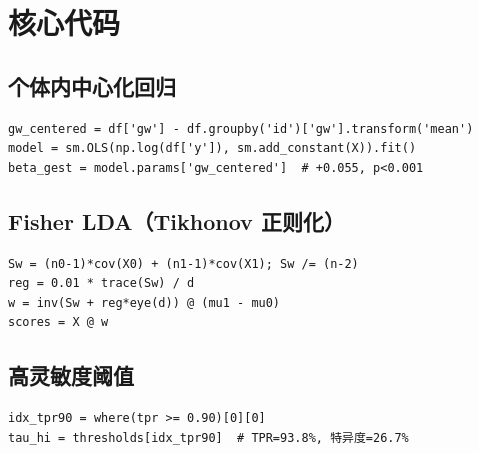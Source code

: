 \documentclass{mcm-paper}
\begin{document}
\section{核心代码}

\subsection{个体内中心化回归}
\begin{verbatim}
gw_centered = df['gw'] - df.groupby('id')['gw'].transform('mean')
model = sm.OLS(np.log(df['y']), sm.add_constant(X)).fit()
beta_gest = model.params['gw_centered']  # +0.055, p<0.001
\end{verbatim}

\subsection{Fisher LDA（Tikhonov 正则化）}
\begin{verbatim}
Sw = (n0-1)*cov(X0) + (n1-1)*cov(X1); Sw /= (n-2)
reg = 0.01 * trace(Sw) / d
w = inv(Sw + reg*eye(d)) @ (mu1 - mu0)
scores = X @ w
\end{verbatim}

\subsection{高灵敏度阈值}
\begin{verbatim}
idx_tpr90 = where(tpr >= 0.90)[0][0]
tau_hi = thresholds[idx_tpr90]  # TPR=93.8%, 特异度=26.7%
\end{verbatim}
\end{document}

